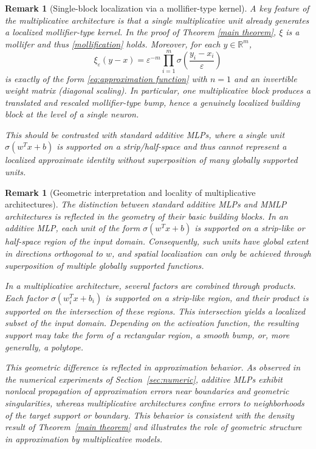 \documentclass[11pt,reqno]{amsart}
\numberwithin{equation}{section}
\newtheorem{remark}[theorem]{\bf{Remark}}
\theoremstyle{remark}
\theoremstyle{definition}
\newcommand\bR{\mathbb{R}}
\begin{document}
\begin{remark}[Single-block localization via a mollifier-type kernel]
\label{rem:single-block-mollifier}
A key feature of the multiplicative architecture is that \emph{a single multiplicative unit}
already generates a localized mollifier-type kernel. In the proof of Theorem \ref{main theorem}, $\xi$ is a mollifer and thus \eqref{mollification} holds. 
Moreover, for each $y\in\bR^{m}$,
\[
\xi_\varepsilon(y-x)
=\varepsilon^{-m}\prod_{i=1}^{m}\sigma\!\left(\frac{y_i-x_i}{\varepsilon}\right)
\]
is exactly of the form \eqref{eq:approximation function} with $n=1$ and an invertible weight
matrix (diagonal scaling).
In particular, \emph{one} multiplicative block produces a translated and rescaled
mollifier-type bump, hence a genuinely localized building block at the level of a single
neuron.

This should be contrasted with standard additive MLPs, where a single unit
$\sigma(w^Tx+b)$ is supported on a strip/half-space and thus cannot represent a localized
approximate identity without superposition of many globally supported units.
\end{remark}

\begin{remark}[Geometric interpretation and locality of multiplicative architectures]
The distinction between standard additive MLPs and MMLP architectures is
reflected in the geometry of their basic building blocks.
In an additive MLP, each unit of the form $\sigma(w^T x + b)$ is supported on a strip-like
or half-space region of the input domain.
Consequently, such units have global extent in directions orthogonal to $w$, and spatial
localization can only be achieved through superposition of multiple globally supported
functions.

In a multiplicative architecture, several factors are combined through products.
Each factor $\sigma(w_i^T x + b_i)$ is supported on a strip-like region, and their product
is supported on the intersection of these regions.
This intersection yields a localized subset of the input domain.
Depending on the activation function, the resulting support may take the form of a
rectangular region, a smooth bump, or, more generally, a polytope.

This geometric difference is reflected in approximation behavior.
As observed in the numerical experiments of Section~\ref{sec:numeric}, additive MLPs
exhibit nonlocal propagation of approximation errors near boundaries and geometric
singularities, whereas multiplicative architectures confine errors to neighborhoods of the
target support or boundary.
This behavior is consistent with the density result of Theorem~\ref{main theorem} and
illustrates the role of geometric structure in approximation by multiplicative models.
\end{remark}
\end{document}
